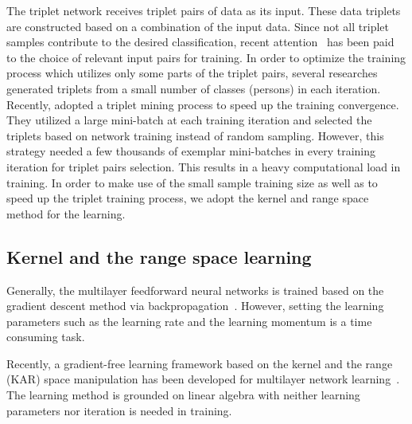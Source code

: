 \documentclass[sigconf]{acmart}
\begin{document}
The triplet network receives triplet pairs of data as its input. These data triplets are constructed based on a combination of the input data. Since not all triplet samples contribute to the desired classification, recent attention~\cite{schroff2015facenet} has been paid to the choice of relevant input pairs for training. In order to optimize the training process which utilizes only some parts of the triplet pairs, several researches~\cite{cheng2016person,ding2015deep,wang2016joint} generated triplets from a small number of classes (persons) in each iteration. Recently, \cite{schroff2015facenet} adopted a triplet mining process to speed up the training convergence. They utilized a large mini-batch at each training iteration and selected the triplets based on network training instead of random sampling. However, this strategy needed a few thousands of exemplar mini-batches in every training iteration for triplet pairs selection. This results in a heavy computational load in training. In order to make use of the small sample training size as well as to speed up the triplet training process, we adopt the kernel and range space method for the learning.

\subsection{Kernel and the range space learning}\label{kar}

Generally, the multilayer feedforward neural networks is trained based on the gradient descent method via backpropagation~\cite{goodfellow2016deep}.
However, setting the learning parameters such as the learning rate and the learning momentum is a time consuming task.

Recently, a gradient-free learning framework based on the kernel and the range (KAR) space manipulation has been developed for multilayer network learning~\cite{toh100,toh2018learning,toh2018analytic,toh2018gradient}.
The learning method is grounded on linear algebra with neither learning parameters nor iteration is needed in training.
\end{document}
